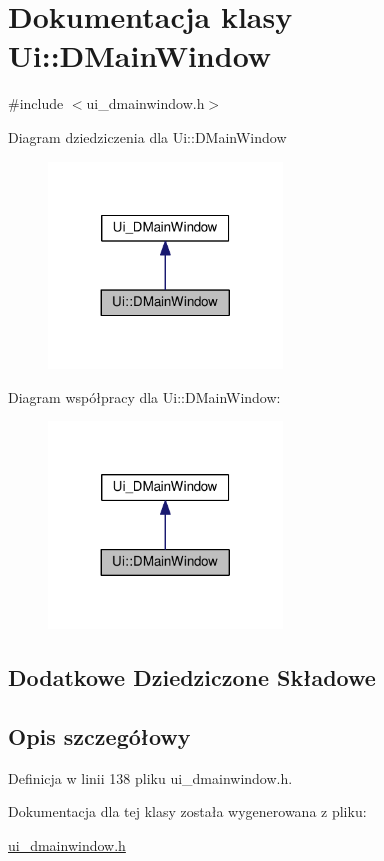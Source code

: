 \hypertarget{class_ui_1_1_d_main_window}{\section{Dokumentacja klasy Ui\-:\-:D\-Main\-Window}
\label{class_ui_1_1_d_main_window}
}


{\ttfamily \#include $<$ui\-\_\-dmainwindow.\-h$>$}



Diagram dziedziczenia dla Ui\-:\-:D\-Main\-Window
\nopagebreak
\begin{figure}[H]
\begin{center}
\leavevmode
\includegraphics[width=176pt]{class_ui_1_1_d_main_window__inherit__graph}
\end{center}
\end{figure}


Diagram współpracy dla Ui\-:\-:D\-Main\-Window\-:
\nopagebreak
\begin{figure}[H]
\begin{center}
\leavevmode
\includegraphics[width=176pt]{class_ui_1_1_d_main_window__coll__graph}
\end{center}
\end{figure}
\subsection*{Dodatkowe Dziedziczone Składowe}


\subsection{Opis szczegółowy}


Definicja w linii 138 pliku ui\-\_\-dmainwindow.\-h.



Dokumentacja dla tej klasy została wygenerowana z pliku\-:\begin{DoxyCompactItemize}
\item 
\hyperlink{ui__dmainwindow_8h}{ui\-\_\-dmainwindow.\-h}\end{DoxyCompactItemize}
